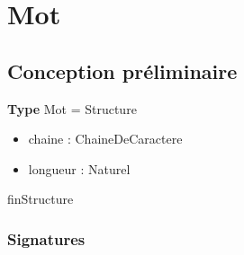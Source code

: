 
    \section*{Mot}
    \subsection*{Conception préliminaire}

    \textbf{Type} Mot = Structure
	\begin{itemize}[label=$\ $, leftmargin=2cm]
		 \item chaine : ChaineDeCaractere
		 \item longueur : Naturel
	\end{itemize}
    finStructure
    
    \subsubsection*{Signatures}

